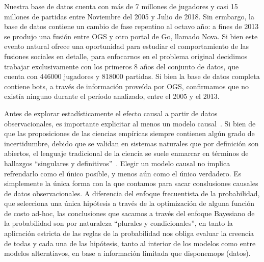 \documentclass[a4paper,11pt]{book}
\theoremstyle{definition}
\begin{document}
Nuestra base de datos cuenta con más de 7 millones de jugadores y casi 15 millones de partidas entre Noviembre del 2005 y Julio de 2018.
%
Sin ermbargo, la base de datos contiene un cambio de fase repentino al octavo año: a fines de 2013 se produjo una fusión entre OGS y otro portal de Go, llamado Nova.
%
Si bien este evento natural ofrece una oportunidad para estudiar el comportamiento de las fusiones sociales en detalle, para enfocarnos en el problema original decidimos trabajar exclusivamente con los primeros 8 años del conjunto de datos, que cuenta con {446000} jugadores y {818000} partidas.
%
Si bien la base de datos completa contiene bots, a través de información proveída por OGS, confirmamos que no existía ninguno durante el período analizado, entre el 2005 y el 2013.

Antes de explorar estadísticamente el efecto causal a partir de datos observacionales, es importante explicitar al menos un modelo causal~\cite{pearl2009-causality}.
%
Si bien de que las proposiciones de las ciencias empíricas siempre contienen algún grado de incertidumbre, debido que se validan en sistemas naturales que por definición son abiertos, el lenguaje tradicional de la ciencia se suele enmarcar en términos de hallazgos ``singulares y definitivos''~\cite{stirling2010-keepItComplex, smaldino2016-badScience, shepherd2021-statisticalPractice}.
%
Elegir un modelo causal no implica refrendarlo como el único posible, y menos aún como el único verdadero.
%
Es simplemente la única forma con la que contamos para sacar conslusiones causales de datos observacionales.
%
A diferencia del enfoque frecuentista de la probabilidad, que selecciona una única hipótesis a través de la optimización de alguna función de costo ad-hoc, las conclusiones que sacamos a través del enfoque Bayesiano de la probabilidad son por naturaleza ``plurales y condicionales'', en tanto la aplicación estricta de las reglas de la probabilidad nos obliga evaluar la creencia de todas y cada una de las hipótesis, tanto al interior de los modelos como entre modelos alterntiavos, en base a información limitada que disponemops (datos).
\end{document}
